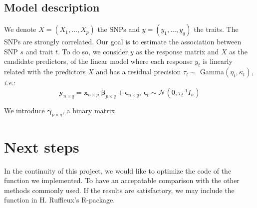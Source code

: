 \documentclass{article}
\numberwithin{equation}{section}
\begin{document}
\subsection{Model description}
We denote $X = (X_1,\ldots,X_p)$ the SNPs and $y = (y_1,\ldots,y_q)$ the traits. The SNPs are strongly correlated. Our goal is to estimate the association between SNP $s$ and trait $t$. To do so, we consider $y$ as the response matrix and $X$ as the candidate predictors, of the linear model where each response $y_t$ is linearly related with the predictors $X$ and has a residual precision $\tau_t\sim$ Gamma$(\eta_t,\kappa_t)$, \textit{i.e.}:
\begin{equation*}
\label{eq:model}
\boldsymbol{y}_{n\times q} = \boldsymbol{x}_{n \times p}\;\boldsymbol{\beta}_{p \times q}+\boldsymbol{\epsilon}_{n \times q}\text{, }\boldsymbol{\epsilon}_t \sim \mathcal{N}(0,\tau_t^{-1}I_n)
\end{equation*}

We introduce $\boldsymbol{\gamma}_{p\times q}$, a binary matrix

%
%
%
%
%
%
%
%
\newpage
\section{Next steps}
In the continuity of this project, we would like to optimize the code of the function we implemented. To have an accepatable comparison with the other methods commonly used. If the results are satisfactory, we may include the function in H. Ruffieux's R-package.
\end{document}
